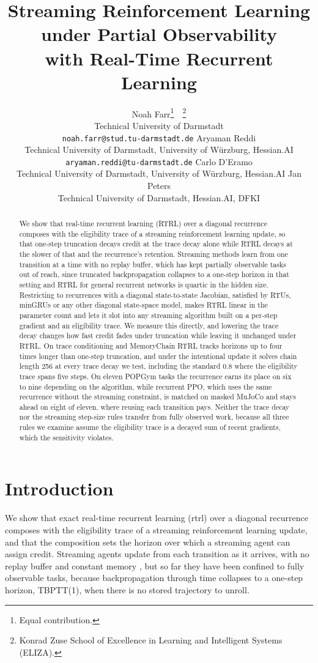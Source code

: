 \documentclass{article}
\title{Streaming Reinforcement Learning under Partial Observability\\with Real-Time Recurrent Learning}
\author{Noah Farr\thanks{Equal contribution.}\ \ \thanks{Konrad Zuse School of Excellence in Learning and Intelligent Systems (ELIZA).}\\
Technical University of Darmstadt\\
\texttt{noah.farr@stud.tu-darmstadt.de}
\And
Aryaman Reddi\footnotemark[1]\\
Technical University of Darmstadt, University of W\"urzburg, Hessian.AI\\
\texttt{aryaman.reddi@tu-darmstadt.de}
\AND
Carlo D'Eramo\\
Technical University of Darmstadt, University of W\"urzburg, Hessian.AI
\And
Jan Peters\\
Technical University of Darmstadt, Hessian.AI, DFKI
}
\begin{document}
\maketitle

\begin{abstract}
We show that real-time recurrent learning (RTRL) over a diagonal recurrence composes with the eligibility trace of a streaming reinforcement learning update, so that one-step truncation decays credit at the trace decay alone while RTRL decays at the slower of that and the recurrence's retention. Streaming methods learn from one transition at a time with no replay buffer, which has kept partially observable tasks out of reach, since truncated backpropagation collapses to a one-step horizon in that setting and RTRL for general recurrent networks is quartic in the hidden size. Restricting to recurrences with a diagonal state-to-state Jacobian, satisfied by RTUs, minGRUs or any other diagonal state-space model, makes RTRL linear in the parameter count and lets it slot into any streaming algorithm built on a per-step gradient and an eligibility trace. We measure this directly, and lowering the trace decay changes how fast credit fades under truncation while leaving it unchanged under RTRL. On trace conditioning and MemoryChain RTRL tracks horizons up to four times longer than one-step truncation, and under the intentional update it solves chain length 256 at every trace decay we test, including the standard $0.8$ where the eligibility trace spans five steps. On eleven POPGym tasks the recurrence earns its place on six to nine depending on the algorithm, while recurrent PPO, which uses the same recurrence without the streaming constraint, is matched on masked MuJoCo and stays ahead on eight of eleven, where reusing each transition pays. Neither the trace decay nor the streaming step-size rules transfer from fully observed work, because all three rules we examine assume the eligibility trace is a decayed sum of recent gradients, which the sensitivity violates.
\end{abstract}

\section{Introduction}
\label{sec:introduction}

We show that exact real-time recurrent learning (\gls{rtrl}) over a diagonal recurrence composes with the eligibility trace of a streaming reinforcement learning update, and that the composition sets the horizon over which a streaming agent can assign credit. Streaming agents update from each transition as it arrives, with no replay buffer and constant memory \citep{elsayed2024streaming, vasan2024deep}, but so far they have been confined to fully observable tasks, because backpropagation through time collapses to a one-step horizon, TBPTT(1), when there is no stored trajectory to unroll.
\end{document}
